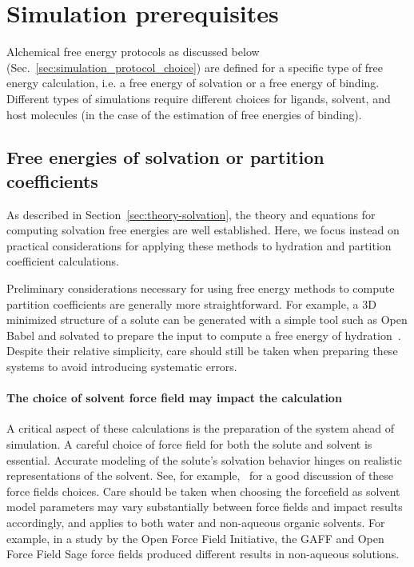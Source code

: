 \documentclass[9pt,bestpractices]{livecoms}
\begin{document}
\section{Simulation prerequisites}
\label{sec:prerequisites}
Alchemical free energy protocols as discussed below (Sec.~\ref{sec:simulation_protocol_choice}) are defined for a specific type of free energy calculation, i.e. a free energy of solvation or a free energy of binding. Different types of simulations require different choices for ligands, solvent, and host molecules (in the case of the estimation of free energies of binding). 

\subsection{Free energies of solvation or partition coefficients}
As described in Section~\ref{sec:theory-solvation}, the theory and equations for computing solvation free energies are well established. Here, we focus instead on practical considerations for applying these methods to hydration and partition coefficient calculations.

\label{subsec:hydration}
Preliminary considerations necessary for using free energy methods to compute partition coefficients are generally more straightforward. For example, a 3D minimized structure of a solute can be generated with a simple tool such as Open Babel and solvated to prepare the input to compute a free energy of hydration~\cite{oboyle2011open}. Despite their relative simplicity, care should still be taken when preparing these systems to avoid introducing systematic errors.

\paragraph{The choice of solvent force field may impact the calculation}
A critical aspect of these calculations is the preparation of the system ahead of simulation.  A careful choice of force field for both the solute and solvent is essential.  Accurate modeling of the solute's solvation behavior hinges on realistic representations of the solvent. See, for example,~\cite{bosisio2016blinded,rustenburg2016measuring} for a good discussion of these force fields choices.  Care should be taken when choosing the forcefield as solvent model parameters may vary substantially between force fields \cite{jambeck2003, kadaoluwa_2021, mobley_2007charge} and impact results accordingly, and applies to both water and non-aqueous organic solvents. For example, in a study by the Open Force Field Initiative, the  GAFF\cite{wang2004gaff} and Open Force Field Sage \cite{boothroyd2023sage} force fields produced different results in non-aqueous solutions. 
\end{document}
